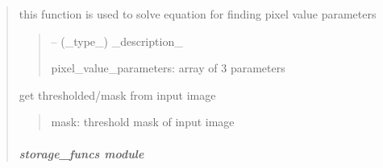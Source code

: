 \documentclass[letterpaper,10pt,english]{sphinxmanual}
\begin{document}
\begin{quote}
\begin{savenotes}
\begin{fulllineitems}
\begin{savenotes}\begin{fulllineitems}
\label{\detokenize{setting/backend/pxvalue_calibration:oxin.backend.pxvalue_calibration.extract_info.solve_equation}}
\pysigstartsignatures
{}
\pysigstopsignatures
\sphinxAtStartPar
this function is used to solve equation for finding pixel value parameters
\begin{quote}\begin{description}
\sphinxAtStartPar
{} – (\_type\_) \_description\_

\sphinxAtStartPar
pixel\_value\_parameters: array of 3 parameters

\end{description}\end{quote}

\end{fulllineitems}\end{savenotes}


\begin{savenotes}\begin{fulllineitems}
\label{\detokenize{setting/backend/pxvalue_calibration:oxin.backend.pxvalue_calibration.extract_info.thrs_map}}
\pysigstartsignatures
{}
\pysigstopsignatures
\sphinxAtStartPar
get thresholded/mask from input image
\begin{quote}\begin{description}
\sphinxAtStartPar
mask: threshold mask of input image

\end{description}\end{quote}

\end{fulllineitems}\end{savenotes}


\end{fulllineitems}\end{savenotes}


\sphinxstepscope


\subparagraph{storage\_funcs module}
\label{\detokenize{setting/backend/storage_funcs:module-oxin.backend.storage_funcs}}\label{\detokenize{setting/backend/storage_funcs:storage-funcs-module}}\label{\detokenize{setting/backend/storage_funcs::doc}}


\end{quote}
\end{document}
